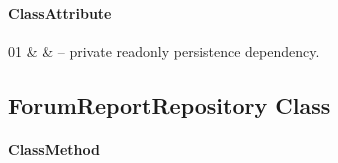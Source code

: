 \paragraph{ClassAttribute}
\begin{ClassAttributeTable}
01 &  &  -- private readonly persistence dependency. \\ \hline
\end{ClassAttributeTable}

\subsection{ForumReportRepository Class}

\paragraph{ClassMethod}
